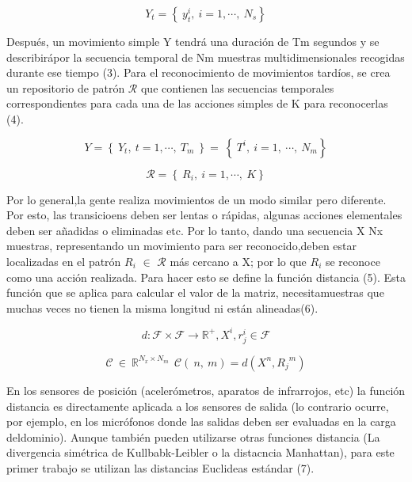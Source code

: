 \documentclass{article}
\begin{document}
\begin{equation} Y_t =  \left\lbrace \ y_t^i,\ i=1,\cdots , \ N_s \right\rbrace
\end{equation}


  Después, un movimiento simple Y tendrá una duración de  Tm  segundos y se describirápor la secuencia temporal de Nm muestras multidimensionales recogidas durante ese tiempo (3). Para el reconocimiento de movimientos tardíos, se crea un repositorio de patrón $\mathcal{R}$ que contienen las secuencias temporales correspondientes para cada una de las acciones simples de K para reconocerlas (4).

\begin{equation}Y =  \left\lbrace \ Y_t, \ t=1,\cdots , \ T_m \ \right\rbrace = \ \left\lbrace \ T^i,\ i=1,\ \cdots , \ N_m \right\rbrace\end{equation}

\begin{equation} \mathcal{R}=  \left\lbrace \ R_i,\ i=1,\cdots ,\ K \right\rbrace\end{equation}

  Por lo general,la gente realiza movimientos de un modo similar pero diferente. Por esto, las transicioens deben ser lentas o rápidas, algunas acciones elementales deben ser añadidas o eliminadas etc. Por lo tanto, dando una secuencia X  Nx muestras, representando un movimiento para ser reconocido,deben estar localizadas en el patrón  $R_i$ $\in$ $\mathcal{R}$ más cercano a X; por lo que $R_i$ se reconoce como una acción realizada. Para hacer esto se define la función distancia (5). Esta función que se aplica para calcular el valor de la matriz, necesitamuestras que muchas veces no tienen la misma longitud ni están alineadas(6).

\begin{equation}d: \mathcal{F} \times \mathcal{F} \longrightarrow \mathbb{R}^+ , X^i,r_j^i \in \mathcal{F} \end{equation}

\begin{equation}\mathcal{C}\ \in\  \mathbb{R}^{N_x\times N_m}  \ \ \mathcal{C}\left(\ n,\ m\right) = d\left({X}^n , {R_j}^m\right)\end{equation}

  En los sensores de posición (acelerómetros, aparatos de infrarrojos, etc) la función distancia es directamente aplicada a los sensores de salida (lo contrario ocurre, por ejemplo, en los micrófonos donde las salidas deben ser evaluadas en la carga deldominio). Aunque también pueden utilizarse otras funciones distancia (La divergencia simétrica de Kullbabk-Leibler o la distacncia Manhattan), para este primer trabajo se utilizan las distancias Euclideas estándar (7).
\end{document}
